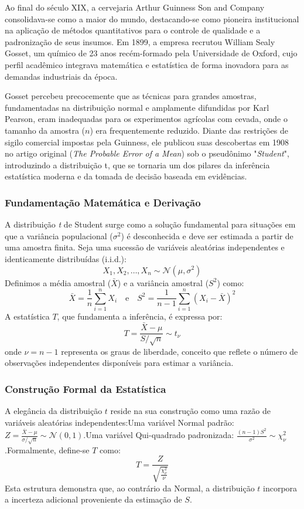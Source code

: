 Ao final do século XIX, a cervejaria Arthur Guinness Son and Company con\-so\-li\-da\-va-se como a maior do mundo, destacando-se como pioneira institucional na aplicação de métodos quantitativos para o controle de qualidade e a padronização de seus insumos. Em 1899, a empresa recrutou William Sealy Gosset, um químico de 23 anos recém-formado pela Universidade de Oxford, cujo perfil acadêmico integrava matemática e estatística de forma inovadora para as demandas industriais da época. \vskip0.3cm

Gosset percebeu precocemente que as técnicas para grandes amostras, fundamentadas na distribuição normal e amplamente difundidas por Karl Pearson, eram inadequadas para os experimentos agrícolas com cevada, onde o tamanho da amostra ($n$) era frequentemente reduzido. Diante das restrições de sigilo comercial impostas pela Guinness, ele publicou suas descobertas em 1908 no artigo original (\textit{The Probable Error of a Mean}) sob o pseu\-dô\-ni\-mo "\textit{Student}", introduzindo a distribuição t, que se tornaria um dos pilares da inferência estatística moderna e da tomada de decisão baseada em evidências.

\subsubsection{Fundamentação Matemática e Derivação}

A distribuição \textit{t} de Student surge como a solução fundamental para situações em que a variância populacional ($\sigma^2$) é desconhecida e deve ser estimada a partir de uma amostra finita. Seja uma sucessão de variáveis aleatórias independentes e identicamente distribuídas (i.i.d.):$$X_1, X_2, \dots, X_n \sim \mathcal{N}(\mu, \sigma^2)$$Definimos a média amostral ($\bar{X}$) e a variância amostral ($S^2$) como:$$\bar{X} = \frac{1}{n} \sum_{i=1}^{n} X_i \quad \text{e} \quad S^2 = \frac{1}{n-1}\sum_{i=1}^{n}(X_i - \bar{X})^2$$A estatística $T$, que fundamenta a inferência, é expressa por:$$T = \frac{\bar{X} - \mu}{S/\sqrt{n}} \sim t_{\nu}$$onde $\nu = n - 1$ representa os graus de liberdade, conceito que reflete o número de observações independentes disponíveis para estimar a variância.

\subsubsection{Construção Formal da Estatística}

A elegância da distribuição $t$ reside na sua construção como uma razão de variáveis aleatórias independentes:Uma variável Normal padrão: $Z = \frac{\bar{X} - \mu}{\sigma/\sqrt{n}} \sim \mathcal{N}(0,1)$.Uma variável Qui-quadrado padronizada: $\frac{(n-1)S^2}{\sigma^2} \sim \chi^2_{\nu}$.Formalmente, define-se $T$ como:$$T = \frac{Z}{\sqrt{\frac{\chi^2_{\nu}}{\nu}}}$$Esta estrutura demonstra que, ao contrário da Normal, a distribuição $t$ incorpora a incerteza adicional proveniente da estimação de $S$.


